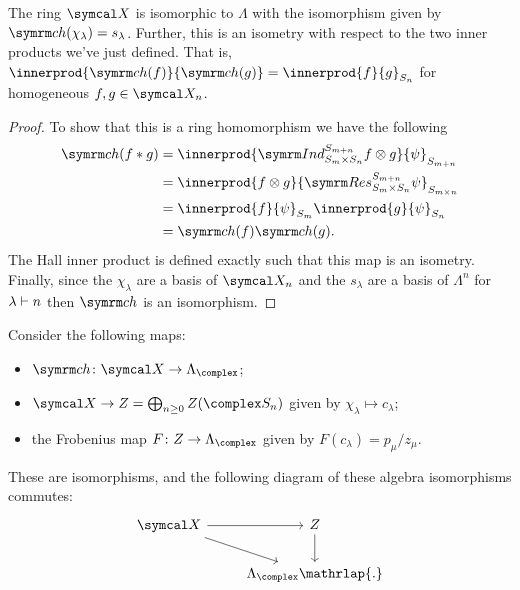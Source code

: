 \begin{thm}{}{}
    The ring \(\classFunctions\) is isomorphic to \(\Lambda\) with the isomorphism given by \(\ch(\chi_\lambda) = s_\lambda\).
    Further, this is an isometry with respect to the two inner products we've just defined.
    That is, \(\innerprod{\ch(f)}{\ch(g)} = \innerprod{f}{g}_{S_n}\) for homogeneous \(f, g \in \classFunctions_n\).
    \begin{proof}
        To show that this is a ring homomorphism we have the following
        \begin{align}
            \ch(f * g) &= \innerprod{\Ind^{S_{m+n}}_{S_m \times S_n} f \otimes g}{\psi}_{S_{m+n}}\\
            &= \innerprod{f \otimes g}{\Res^{S_{m+n}}_{S_m \times S_n} \psi}_{S_{m\times n}}\\
            &= \innerprod{f}{\psi}_{S_m} \innerprod{g}{\psi}_{S_n}\\
            &= \ch(f) \ch(g).
        \end{align}
        The Hall inner product is defined exactly such that this map is an isometry.
        Finally, since the \(\chi_\lambda\) are a basis of \(\classFunctions_n\) and the \(s_\lambda\) are a basis of \(\Lambda^n\) for \(\lambda \vdash n\) then \(\ch\) is an isomorphism.
    \end{proof}
\end{thm}

\begin{thm}{}{}
    Consider the following maps:
    \begin{itemize}
        \item \(\ch \colon \classFunctions \to \Lambda_{\complex}\);
        \item \(\classFunctions \to Z = \bigoplus_{n \ge 0} Z(\complex S_n)\) given by \(\chi_\lambda \mapsto c_\lambda\);
        \item the Frobenius map \(F \colon Z \to \Lambda_{\complex}\) given by \(F(c_\lambda) = p_\mu/z_\mu\).
    \end{itemize}
    These are isomorphisms, and the following diagram of these algebra isomorphisms commutes:
    \begin{equation}
        \begin{tikzcd}
            \classFunctions \arrow[r] \arrow[dr] & Z \arrow[d]\\
            & \Lambda_{\complex}\mathrlap{.}
        \end{tikzcd}
    \end{equation}
\end{thm}

